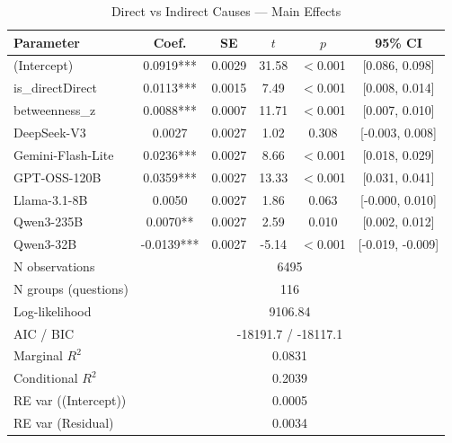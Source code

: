 \begin{table}[htbp]
\centering
\small
\caption{Direct vs Indirect Causes --- Main Effects}
\label{tab:lme_direct_main_table}
\begin{tabular}{lccccc}
\toprule
Parameter & Coef. & SE & $t$ & $p$ & 95\% CI \\
\midrule
  (Intercept) & 0.0919*** & 0.0029 & 31.58 & $<$0.001 & [0.086, 0.098] \\
  is\_directDirect & 0.0113*** & 0.0015 & 7.49 & $<$0.001 & [0.008, 0.014] \\
  betweenness\_z & 0.0088*** & 0.0007 & 11.71 & $<$0.001 & [0.007, 0.010] \\
  DeepSeek-V3 & 0.0027 & 0.0027 & 1.02 & 0.308 & [-0.003, 0.008] \\
  Gemini-Flash-Lite & 0.0236*** & 0.0027 & 8.66 & $<$0.001 & [0.018, 0.029] \\
  GPT-OSS-120B & 0.0359*** & 0.0027 & 13.33 & $<$0.001 & [0.031, 0.041] \\
  Llama-3.1-8B & 0.0050 & 0.0027 & 1.86 & 0.063 & [-0.000, 0.010] \\
  Qwen3-235B & 0.0070** & 0.0027 & 2.59 & 0.010 & [0.002, 0.012] \\
  Qwen3-32B & -0.0139*** & 0.0027 & -5.14 & $<$0.001 & [-0.019, -0.009] \\
\midrule
  N observations & \multicolumn{5}{c}{6495} \\
  N groups (questions) & \multicolumn{5}{c}{116} \\
  Log-likelihood & \multicolumn{5}{c}{9106.84} \\
  AIC / BIC & \multicolumn{5}{c}{-18191.7 / -18117.1} \\
  Marginal $R^2$ & \multicolumn{5}{c}{0.0831} \\
  Conditional $R^2$ & \multicolumn{5}{c}{0.2039} \\
  RE var ((Intercept)) & \multicolumn{5}{c}{0.0005} \\
  RE var (Residual) & \multicolumn{5}{c}{0.0034} \\
\bottomrule
\end{tabular}
\end{table}
